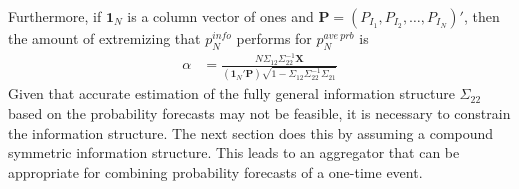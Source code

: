 \documentclass[11pt]{article}
\theoremstyle{definition}
\theoremstyle{definition}
\begin{document}
Furthermore, if $\boldsymbol{1}_N$ is a column vector of ones and $\boldsymbol{P} = (P_{I_1}, P_{I_2}, \dots, P_{I_N})'$, then the amount of extremizing that $p_N^{info}$ performs for $p_{N}^{ave\ prb}$ is
\begin{align}
\alpha  &= \frac{N \Sigma_{12} \Sigma_{22}^{-1} \boldsymbol{X}}{\left(\boldsymbol{1}_N' \boldsymbol{P} \right) \sqrt{1 - \Sigma_{12} \Sigma_{22}^{-1} \Sigma_{21}}} \label{alpha}
\end{align}
Given that accurate estimation of the fully general information structure $\Sigma_{22}$ based on the probability forecasts may not be feasible, it is necessary to constrain the information structure. The next section does this by assuming a compound symmetric information structure. This leads to an aggregator that can be appropriate for combining probability forecasts of a one-time event. 



\end{document}
